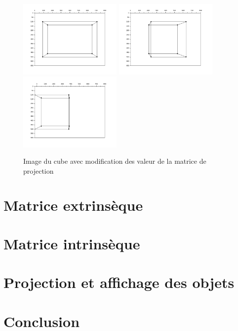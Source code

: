 \documentclass[a4paper,11pt]{article}
\begin{document}
  \begin{figure}[H]
    \center
    \includegraphics[width=5cm]{ProjectionTaille.png}
    \includegraphics[width=5cm]{ProjectionRotation.png}
    \includegraphics[width=5cm]{ProjectionTranslation.png}
    \caption{Image du cube avec modification des valeur de la matrice de projection}
  \end{figure}

  \section{Matrice extrinsèque}
  \section{Matrice intrinsèque}
  \section{Projection et affichage des objets}
  
  
  \section*{Conclusion}
  
    
\end{document}

